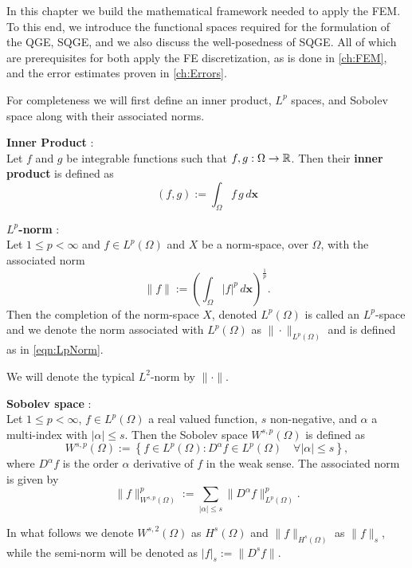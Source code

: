 In this chapter we build the mathematical framework needed to apply the FEM. To
this end, we introduce the functional spaces required for the formulation of the
QGE, SQGE, and we also discuss the well-posedness of SQGE. All of which are
prerequisites for both apply the FE discretization, as is done in
\autoref{ch:FEM}, and the error estimates proven in \autoref{ch:Errors}.

For completeness we will first define an inner product, $L^p$ spaces, and
Sobolev space along with their associated norms.

\begin{definition} \label{def:InnerProduct}
  \textbf{Inner Product} \cite{Kreyszig1989}: \\
  Let $f$ and $g$ be integrable functions such that $f,g : \Omega \rightarrow \mathbb{R}$.
  Then their \textbf{inner product} is defined as
  \begin{equation}
    (f,g) := \int_{\Omega}\! f \, g\, d\mathbf{x}
    \label{eqn:InnerProduct}
  \end{equation}
\end{definition}

\begin{definition} \label{def:LpNorm}
  \textbf{$L^p$-norm} \cite{Kreyszig1989}: \\
  Let $1\le p < \infty$ and $f \in L^p(\Omega)$ and $X$ be a norm-space, over
  $\Omega$, with the associated norm
  \begin{equation}
    \|f\| := \left(\int_{\Omega}\! |f|^p\, d\mathbf{x}\right)^{\frac{1}{p}}.
    \label{eqn:LpNorm}
  \end{equation}
  Then the completion of the norm-space $X$, denoted $L^p(\Omega)$ is called an
  $L^p$-space and we denote the norm associated with $L^p(\Omega)$ as
  $\|\cdot\|_{L^p(\Omega)}$ and is defined as in \eqref{eqn:LpNorm}.
\end{definition}
We will denote the typical $L^2$-norm by $\|\cdot\|$.

\begin{definition} \label{SobolevSpace}
  \textbf{Sobolev space} \cite{Evans1998}: \\
  Let $1\le p < \infty$, $f \in L^p(\Omega)$ a real valued function, $s$
  non-negative, and $\alpha$ a multi-index with $|\alpha| \le s$. Then the
  Sobolev space $W^{s,p}(\Omega)$ is defined as
  \begin{equation}
    W^{s,p}(\Omega) := \left\{ f\in L^p(\Omega) : D^{\alpha} f \in
      L^p(\Omega)\quad \forall |\alpha| \le s\right\},
    \label{eqn:Sobolev}
  \end{equation}
  where $D^{\alpha}f$ is the order $\alpha$ derivative of $f$ in the weak sense.
  The associated norm is given by
  \begin{equation}
    \|f\|_{W^{s,p}(\Omega)}^p := \sum_{|\alpha|\le s}
      \|D^{\alpha}f\|_{L^p(\Omega)}^p.
    \label{eqn:HkpNorm}
  \end{equation}
\end{definition}
In what follows we denote $W^{s,2}(\Omega)$ as $H^s(\Omega)$ and
$\|f\|_{H^s(\Omega)}$ as $\|f\|_s$, while the semi-norm will be denoted
as $|f|_s := \|D^s f\|$.

